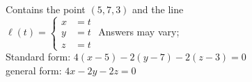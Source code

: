 {Contains the point $(5,7,3)$ and the line\\
$\ell(t) = \left\{\begin{aligned} x&=t \\
																	y&=t \\
																	z&=t \end{aligned}\right.$
}
{Answers may vary;\\
Standard form: $4(x-5)-2(y-7)-2(z-3)=0$\\
general form: $4x-2y-2z=0$
}

